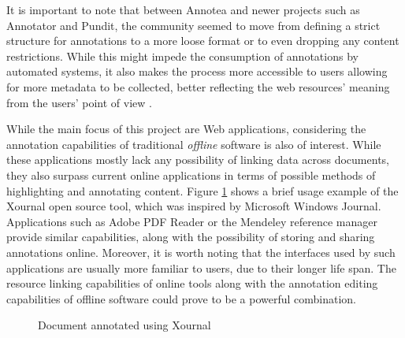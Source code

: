 It is important to note that between Annotea and newer projects such as
Annotator and Pundit, the community seemed to move from defining a strict
structure for annotations to a more loose format or to even dropping any
content restrictions. While this might impede the consumption of annotations by
automated systems, it also makes the process more accessible to users allowing
for more metadata to be collected, better reflecting the web resources' meaning
from the users' point of view \cite{ref:wu}.

While the main focus of this project are Web applications, considering the
annotation capabilities of traditional \textit{offline} software is also of
interest. While these applications mostly lack any possibility of linking data
across documents, they also surpass current online applications in terms of
possible methods of highlighting and annotating content. Figure
\ref{fig:xournal} shows a brief usage example of the Xournal open source tool,
which was inspired by Microsoft Windows Journal. Applications such as Adobe PDF
Reader or the Mendeley reference manager provide similar capabilities, along
with the possibility of storing and sharing annotations online. Moreover, it is
worth noting that the interfaces used by such applications are usually more
familiar to users, due to their longer life span. The resource linking
capabilities of online tools along with the annotation editing capabilities of
offline software could prove to be a powerful combination.

\begin{figure}[!ht]
  \centering
  \caption{Document annotated using Xournal}
  \label{fig:xournal}
\end{figure}
